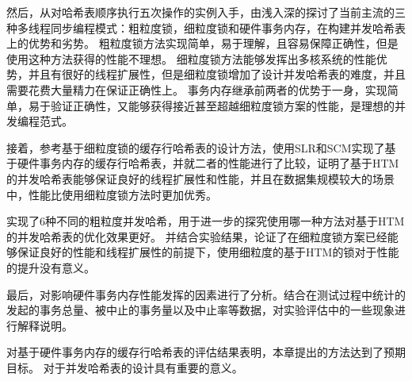 然后，从对哈希表顺序执行五次操作的实例入手，由浅入深的探讨了当前主流的三种多线程同步编程模式：粗粒度锁，细粒度锁和硬件事务内存，在构建并发哈希表上的优势和劣势。
粗粒度锁方法实现简单，易于理解，且容易保障正确性，但是使用这种方法获得的性能不理想。
细粒度锁方法能够发挥出多核系统的性能优势，并且有很好的线程扩展性，但是细粒度锁增加了设计并发哈希表的难度，并且需要花费大量精力在保证正确性上。
事务内存继承前两者的优势于一身，实现简单，易于验证正确性，又能够获得接近甚至超越细粒度锁方案的性能，是理想的并发编程范式。

接着，参考基于细粒度锁的缓存行哈希表的设计方法，使用SLR和SCM实现了基于硬件事务内存的缓存行哈希表，并就二者的性能进行了比较，证明了基于HTM的并发哈希表能够保证良好的线程扩展性和性能，并且在数据集规模较大的场景中，性能比使用细粒度锁方法时更加优秀。

实现了6种不同的粗粒度并发哈希，用于进一步的探究使用哪一种方法对基于HTM的并发哈希表的优化效果更好。
并结合实验结果，论证了在细粒度锁方案已经能够保证良好的性能和线程扩展性的前提下，使用细粒度的基于HTM的锁对于性能的提升没有意义。

最后，对影响硬件事务内存性能发挥的因素进行了分析。结合在测试过程中统计的发起的事务总量、被中止的事务量以及中止率等数据，对实验评估中的一些现象进行解释说明。

对基于硬件事务内存的缓存行哈希表的评估结果表明，本章提出的方法达到了预期目标。
对于并发哈希表的设计具有重要的意义。

